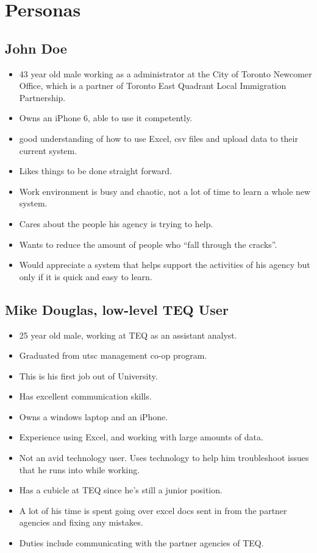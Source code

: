 \documentclass[12pt]{article}
\begin{document}
\section{Personas}
\subsection{John Doe}
\begin{itemize}%
\item 43 year old male working as a administrator at the City of Toronto Newcomer Office, which is a partner of Toronto East Quadrant Local Immigration Partnership.
\item Owns an iPhone 6, able to use it competently.
\item good understanding of how to use Excel, csv files and upload data to their current system.
\item Likes things to be done straight forward.
\item Work environment is busy and chaotic, not a lot of time to learn a whole new system.
\item Cares about the people his agency is trying to help.
\item Wants to reduce the amount of people who “fall through the cracks”.
\item Would appreciate a system that helps support the activities of his agency but only if it is quick and easy to learn.

 \end{itemize}

\subsection{Mike Douglas, low-level TEQ User}
\begin{itemize}%
\item 25 year old male, working at TEQ as an assistant analyst.
\item Graduated from utsc management co-op program.
\item This is his first job out of University.
\item Has excellent communication skills.
\item Owns a windows laptop and an iPhone.
\item Experience using Excel, and working with large amounts of data.
\item Not an avid technology user. Uses technology to help him troubleshoot issues that he runs into while working.
\item Has a cubicle at TEQ since he’s still a junior position.
\item A lot of his time is spent going over excel docs sent in from the partner agencies and fixing any mistakes.
\item Duties include communicating with the partner agencies of TEQ.

 \end{itemize}
 
\end{document}
